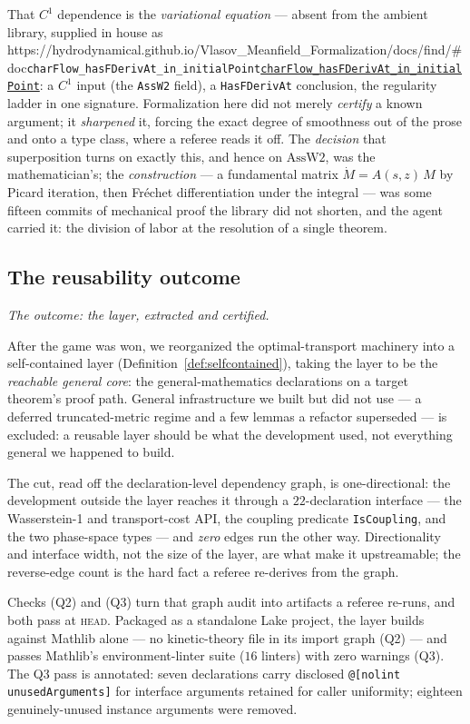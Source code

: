 \documentclass[11pt]{article}
\theoremstyle{plain}
\theoremstyle{definition}
\theoremstyle{remark}
\newcommand{\lean}[1]{\texttt{#1}}
\newcommand{\leanbaseurl}{https://hydrodynamical.github.io/Vlasov\_Meanfield\_Formalization/docs/find/\#doc}
\newcommand{\leanlink}[1]{\ifx\leanbaseurl\empty\lean{#1}\else\href{\leanbaseurl/Vlasov.#1}{\lean{#1}}\fi}
\begin{document}
That $C^1$ dependence is the \emph{variational equation} --- absent from the
ambient library, supplied in house as
\leanlink{charFlow\_hasFDerivAt\_in\_initialPoint}: a $C^1$ input (the \lean{AssW2}
field), a \lean{HasFDerivAt} conclusion, the regularity ladder in one signature.
Formalization here did not merely \emph{certify} a known argument; it
\emph{sharpened} it, forcing the exact degree of smoothness out of the prose and
onto a type class, where a referee reads it off. The \emph{decision} that
superposition turns on exactly this, and hence on $\mathrm{AssW2}$, was the
mathematician's; the \emph{construction} --- a fundamental matrix
$\dot M = A(s,z)\,M$ by Picard iteration, then Fr\'echet differentiation under the
integral --- was some fifteen commits of mechanical proof the library did not
shorten, and the agent carried it: the division of labor at the resolution of a
single theorem.

\subsection{The reusability outcome}\label{ssec:reuse}

\noindent\emph{The outcome: the layer, extracted and certified.}

After the game was won, we reorganized the optimal-transport machinery into a
self-contained layer (Definition~\ref{def:selfcontained}), taking the layer to be
the \emph{reachable general core}: the general-mathematics declarations on a target
theorem's proof path. General infrastructure we built but did not use --- a deferred
truncated-metric regime and a few lemmas a refactor superseded --- is excluded: a
reusable layer should be what the development used, not everything general we
happened to build.

The cut, read off the declaration-level dependency graph, is one-directional: the
development outside the layer reaches it through a $22$-declaration interface ---
the Wasserstein-1 and transport-cost API, the coupling predicate \lean{IsCoupling},
and the two phase-space types --- and \emph{zero} edges run the other way.
Directionality and interface width, not the size of the layer, are what make it
upstreamable; the reverse-edge count is the hard fact a referee re-derives from
the graph.

Checks (Q2) and (Q3) turn that graph audit into artifacts a referee re-runs, and
both pass at \textsc{head}. Packaged as a standalone Lake project, the layer builds
against Mathlib alone --- no kinetic-theory file in its import graph (Q2) --- and
passes Mathlib's environment-linter suite ($16$ linters) with zero warnings (Q3).
The Q3 pass is annotated: seven declarations carry disclosed
\lean{@[nolint unusedArguments]} for interface arguments retained for caller
uniformity; eighteen genuinely-unused instance arguments were removed.
\end{document}
